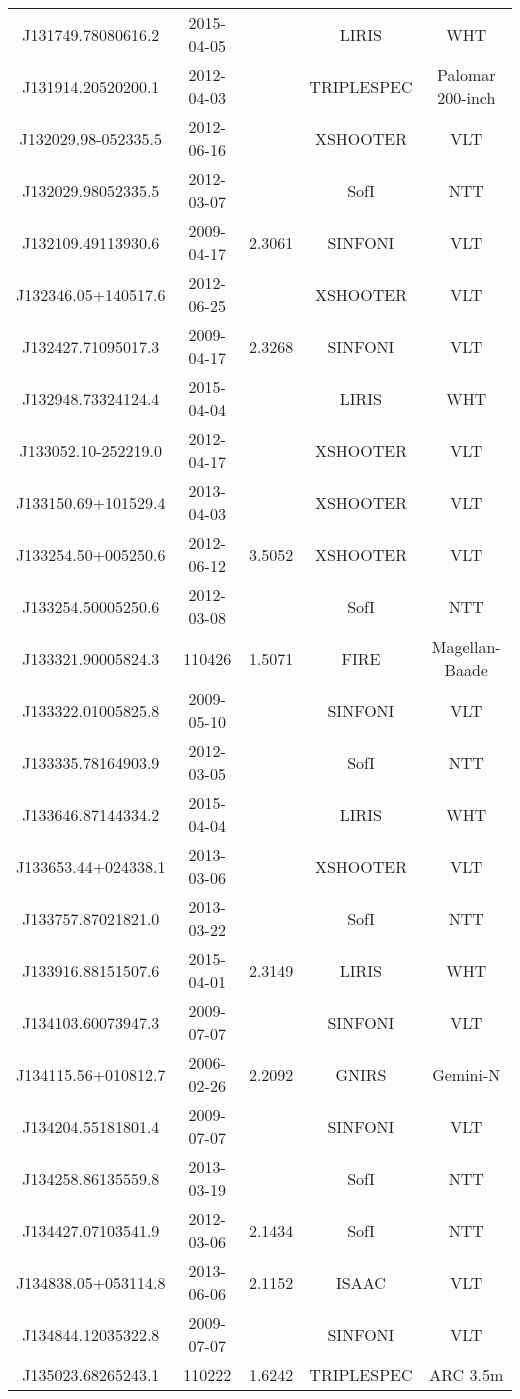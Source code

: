 {\begin{longtable}{ccccc}
J131749.78080616.2 & 2015-04-05 &  & LIRIS & WHT \\
J131914.20520200.1 & 2012-04-03 &  & TRIPLESPEC & Palomar 200-inch \\
J132029.98-052335.5 & 2012-06-16 &  & XSHOOTER & VLT \\
J132029.98052335.5 & 2012-03-07 &  & SofI & NTT \\
J132109.49113930.6 & 2009-04-17 & 2.3061 & SINFONI & VLT \\
J132346.05+140517.6 & 2012-06-25 &  & XSHOOTER & VLT \\
J132427.71095017.3 & 2009-04-17 & 2.3268 & SINFONI & VLT \\
J132948.73324124.4 & 2015-04-04 &  & LIRIS & WHT \\
J133052.10-252219.0 & 2012-04-17 &  & XSHOOTER & VLT \\
J133150.69+101529.4 & 2013-04-03 &  & XSHOOTER & VLT \\
J133254.50+005250.6 & 2012-06-12 & 3.5052 & XSHOOTER & VLT \\
J133254.50005250.6 & 2012-03-08 &  & SofI & NTT \\
J133321.90005824.3 & 110426 & 1.5071 & FIRE & Magellan-Baade \\
J133322.01005825.8 & 2009-05-10 &  & SINFONI & VLT \\
J133335.78164903.9 & 2012-03-05 &  & SofI & NTT \\
J133646.87144334.2 & 2015-04-04 &  & LIRIS & WHT \\
J133653.44+024338.1 & 2013-03-06 &  & XSHOOTER & VLT \\
J133757.87021821.0 & 2013-03-22 &  & SofI & NTT \\
J133916.88151507.6 & 2015-04-01 & 2.3149 & LIRIS & WHT \\
J134103.60073947.3 & 2009-07-07 &  & SINFONI & VLT \\
J134115.56+010812.7 & 2006-02-26 & 2.2092 & GNIRS & Gemini-N \\
J134204.55181801.4 & 2009-07-07 &  & SINFONI & VLT \\
J134258.86135559.8 & 2013-03-19 &  & SofI & NTT \\
J134427.07103541.9 & 2012-03-06 & 2.1434 & SofI & NTT \\
J134838.05+053114.8 & 2013-06-06 & 2.1152 & ISAAC & VLT \\
J134844.12035322.8 & 2009-07-07 &  & SINFONI & VLT \\
J135023.68265243.1 & 110222 & 1.6242 & TRIPLESPEC & ARC 3.5m \\

\end{longtable}}
